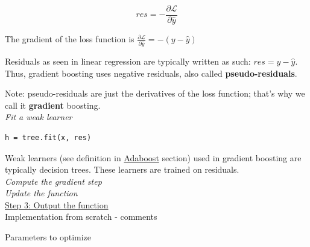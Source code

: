 $$res = - \frac{\partial \mathcal{L}}{\partial \hat y}$$

The gradient of the loss function is $\frac{\partial \mathcal{L}}{\partial \hat y} = -(y - \hat y)$

Residuals as seen in linear regression are typically written as such: $res = y - \hat y$. Thus, gradient boosting uses negative residuals, also called \textbf{pseudo-residuals}. 

Note: pseudo-residuals are just the derivatives of the loss function; that's why we call it \textbf{gradient} boosting. \\

\textit{Fit a weak learner} \\

\lstset{language=Python}
\lstset{frame=lines}
\lstset{basicstyle=\footnotesize}
\begin{lstlisting}
h = tree.fit(x, res)
\end{lstlisting}

Weak learners (see definition in \hyperref[sec:adaboost]{Adaboost} section) used in gradient boosting are typically decision trees. These learners are trained on residuals. \\

\textit{Compute the gradient step} \\



\textit{Update the function} \\

\underline{Step 3: Output the function} \\


Implementation from scratch - comments

Parameters to optimize

\vspace{5mm}